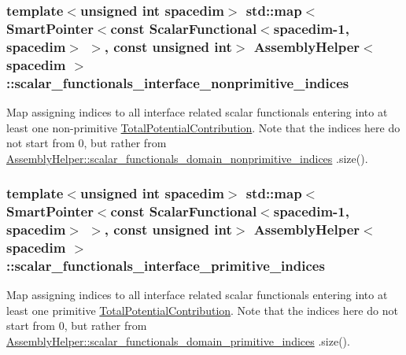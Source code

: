 \subsubsection[{\texorpdfstring{scalar\+\_\+functionals\+\_\+interface\+\_\+nonprimitive\+\_\+indices}{scalar_functionals_interface_nonprimitive_indices}}]{\setlength{\rightskip}{0pt plus 5cm}template$<$unsigned int spacedim$>$ std\+::map$<${\bf Smart\+Pointer}$<$const {\bf Scalar\+Functional}$<$spacedim-\/1, spacedim$>$ $>$, const unsigned int$>$ {\bf Assembly\+Helper}$<$ spacedim $>$\+::scalar\+\_\+functionals\+\_\+interface\+\_\+nonprimitive\+\_\+indices\hspace{0.3cm}{\ttfamily [private]}}\hypertarget{class_assembly_helper_a0d15b3ab0c7bec9fc4f40e532f8776f4}{}\label{class_assembly_helper_a0d15b3ab0c7bec9fc4f40e532f8776f4}
Map assigning indices to all interface related scalar functionals entering into at least one non-\/primitive \hyperlink{class_total_potential_contribution}{Total\+Potential\+Contribution}. Note that the indices here do not start from 0, but rather from \hyperlink{class_assembly_helper_acf05fab2ddf57769a103d82a4f2d1cd3}{Assembly\+Helper\+::scalar\+\_\+functionals\+\_\+domain\+\_\+nonprimitive\+\_\+indices} .size(). 
\subsubsection[{\texorpdfstring{scalar\+\_\+functionals\+\_\+interface\+\_\+primitive\+\_\+indices}{scalar_functionals_interface_primitive_indices}}]{\setlength{\rightskip}{0pt plus 5cm}template$<$unsigned int spacedim$>$ std\+::map$<${\bf Smart\+Pointer}$<$const {\bf Scalar\+Functional}$<$spacedim-\/1, spacedim$>$ $>$, const unsigned int$>$ {\bf Assembly\+Helper}$<$ spacedim $>$\+::scalar\+\_\+functionals\+\_\+interface\+\_\+primitive\+\_\+indices\hspace{0.3cm}{\ttfamily [private]}}\hypertarget{class_assembly_helper_ad99c75f32cf3f18aa1d4067ad8b56ae8}{}\label{class_assembly_helper_ad99c75f32cf3f18aa1d4067ad8b56ae8}
Map assigning indices to all interface related scalar functionals entering into at least one primitive \hyperlink{class_total_potential_contribution}{Total\+Potential\+Contribution}. Note that the indices here do not start from 0, but rather from \hyperlink{class_assembly_helper_a4f08790a2235e48ce19f5d8d965a7874}{Assembly\+Helper\+::scalar\+\_\+functionals\+\_\+domain\+\_\+primitive\+\_\+indices} .size(). 
